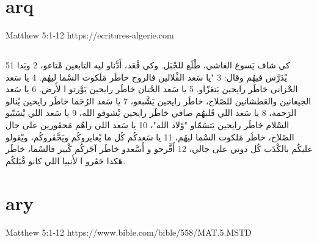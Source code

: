 \documentclass[12pt,fleqn,titlepage,twoside,a4paper]{book}
\begin{document}
\section{arq}

Matthew 5:1-12 https://ecritures-algerie.com

\begin{arab}[utf]
\section*{}


51 كي شاف يَسوع الغاشي، طْلَع للجْبَل. وكي قْعَد، أَدَّناو ليه التابعين مْتاعو، 2 وبَدا يْدَرَّس فيهُم وقال: 3 "يا سَعد الڤْلالين فالروح خاطَر
مَلَكوت السْما ليهُم. 4 يا سَعد الحْزانى خاطَر رايحين يَتعَزّاو. 5 يا سَعد الحْنان خاطَر رايحين يَوَّرتو ا لأَرض. 6 يا سَعد الجيعانين
والعَطشانين للصْلاح، خاطَر رايحين يَشَّبعو، 7 يا سَعد الرُحَما خاطَر رايحين يْنالو الرَحمة، 8 يا سَعد اللي قَلبهُم صافي خاطَر رايحين يْشوفو الله،
9 يا سَعد اللي يْسَبّبو السْلام خاطَر رايحين يَتسَمّاو "وْلاد الله"، 10 يا سَعد اللي راهُم مَحڤورين على جال الصْلاح، خاطَر مَلكوت السْما ليهُم، 11 يا
سَعدكُم كُل ما يْعايروكُم ويَحَّڤروكُم، ويْقولو عليكُم بالكْدَب كُل دوني على جالي، 12 أَفَّرحو و أَسَّعدو خاطَر آجَركُم كْبير فالسْما، خاطَر هَكدا حَڤرو
ا لأَنبيا اللي كانو قْبَلكُم.
\end{arab}





\section{ary}

Matthew 5:1-12 https://www.bible.com/bible/558/MAT.5.MSTD
\end{document}
